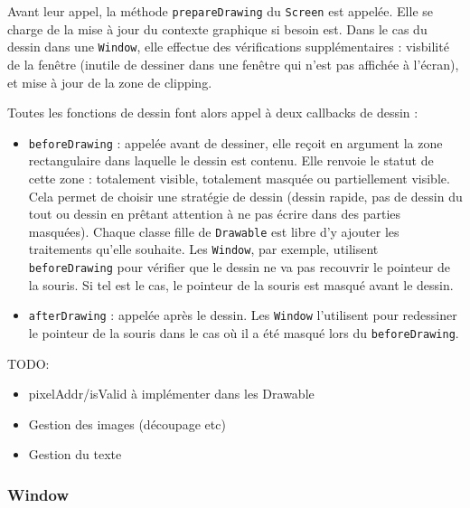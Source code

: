 \vspace{1em}

Avant leur appel, la méthode \verb|prepareDrawing| du \verb|Screen| est appelée. Elle se charge de la mise à jour du contexte graphique si besoin est. Dans le cas du dessin dans une \verb|Window|, elle effectue des vérifications supplémentaires : visbilité de la fenêtre (inutile de dessiner dans une fenêtre qui n'est pas affichée à l'écran), et mise à jour de la zone de clipping.

Toutes les fonctions de dessin font alors appel à deux callbacks de dessin :
\begin{itemize}
  \item \verb|beforeDrawing| : appelée avant de dessiner, elle reçoit en argument la zone rectangulaire dans laquelle le dessin est contenu. Elle renvoie le statut de cette zone : totalement visible, totalement masquée ou partiellement visible. Cela permet de choisir une stratégie de dessin (dessin rapide, pas de dessin du tout ou dessin en prêtant attention à ne pas écrire dans des parties masquées). Chaque classe fille de \verb|Drawable| est libre d'y ajouter les traitements qu'elle souhaite. Les \verb|Window|, par exemple, utilisent \verb|beforeDrawing| pour vérifier que le dessin ne va pas recouvrir le pointeur de la souris. Si tel est le cas, le pointeur de la souris est masqué avant le dessin.
  \item \verb|afterDrawing| : appelée après le dessin. Les \verb|Window| l'utilisent pour redessiner le pointeur de la souris dans le cas où il a été masqué lors du \verb|beforeDrawing|.
\end{itemize}

\vspace{1em}

TODO:
\begin{itemize}
  \item pixelAddr/isValid à implémenter dans les Drawable
  \item Gestion des images (découpage etc)
  \item Gestion du texte
\end{itemize}

\subsubsection{Window}

